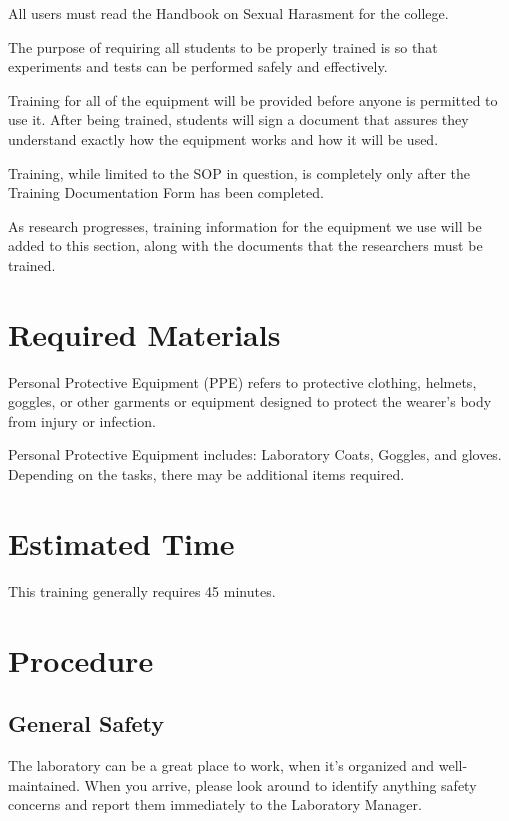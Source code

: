 \documentclass[12pt]{../../cls/SOP4_alpha}\usepackage[]{graphicx}\usepackage[]{xcolor}
\begin{document}
\NP All users must read the Handbook on Sexual Harasment for the college.

\NP The purpose of requiring all students to be properly trained is so that experiments and tests can be performed safely and effectively.  

\NP Training for all of the equipment will be provided before anyone is permitted to use it.  After being trained, students will sign a document that assures they understand exactly how the equipment works and how it will be used.

\NP Training, while limited to the SOP in question, is completely only after the Training Documentation Form has been completed.

\NP As research progresses, training information for the equipment we use will be added to this section, along with the documents that the researchers must be trained.

\section{Required Materials}

\NP Personal Protective Equipment (PPE) refers to protective clothing, helmets, goggles, or other garments or equipment designed to protect the wearer's body from injury or infection. 

\NP Personal Protective Equipment includes: Laboratory Coats, Goggles, and gloves. Depending on the tasks, there may be additional items required.

\section{Estimated Time}

\NP This training generally requires 45 minutes.

\section{Procedure}

\subsection*{General Safety}

\NP The laboratory can be a great place to work, when it's organized and well-maintained. When you arrive, please look around to identify anything safety concerns and report them immediately to the Laboratory Manager. 
\end{document}
